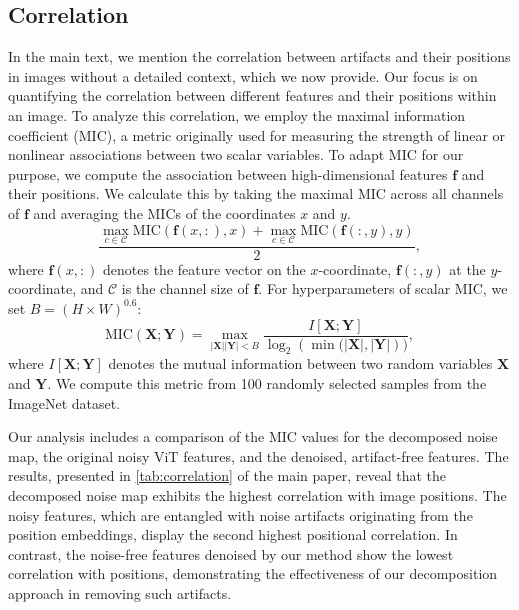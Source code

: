 \subsection{Correlation}
In the main text, we mention the correlation between artifacts and their positions in images without a detailed context, which we now provide. Our focus is on quantifying the correlation between different features and their positions within an image. To analyze this correlation, we employ the maximal information coefficient (MIC), a metric originally used for measuring the strength of linear or nonlinear associations between two scalar variables. To adapt MIC for our purpose, we compute the association between high-dimensional features $\mathbf{f}$ and their positions. We calculate this by taking the maximal MIC across all channels of $\mathbf{f}$ and averaging the MICs of the coordinates $x$ and $y$.
\begin{equation}
    \frac{\max_{c \in \mathcal{C}}{\text{MIC}(\mathbf{f}(x, :), x)} + \max_{c \in \mathcal{C}}{\text{MIC}(\mathbf{f}(:, y), y)}}{2},
\end{equation}
where $\mathbf{f}(x, :)$ denotes the feature vector on the $x$-coordinate, $\mathbf{f}(:, y)$ at the $y$-coordinate, and $\mathcal{C}$ is the channel size of $\mathbf{f}$. For hyperparameters of scalar MIC, we set $B=(H \times W)^{0.6}$:
\begin{equation}
    \text{MIC}(\mathbf{X}; \mathbf{Y}) = \max_{|\mathbf{X}| |\mathbf{Y}| < B} \frac{I[\mathbf{X}; \mathbf{Y}]}{\log_2{(\min{(|\mathbf{X}|, |\mathbf{Y}|}))}},
\end{equation}
where $I[\mathbf{X}; \mathbf{Y}]$ denotes the mutual information between two random variables $\mathbf{X}$ and $\mathbf{Y}$. We compute this metric from 100 randomly selected samples from the ImageNet dataset.

Our analysis includes a comparison of the MIC values for the decomposed noise map, the original noisy ViT features, and the denoised, artifact-free features. The results, presented in \cref{tab:correlation} of the main paper, reveal that the decomposed noise map exhibits the highest correlation with image positions. The noisy features, which are entangled with noise artifacts originating from the position embeddings, display the second highest positional correlation. In contrast, the noise-free features denoised by our method show the lowest correlation with positions, demonstrating the effectiveness of our decomposition approach in removing such artifacts.

